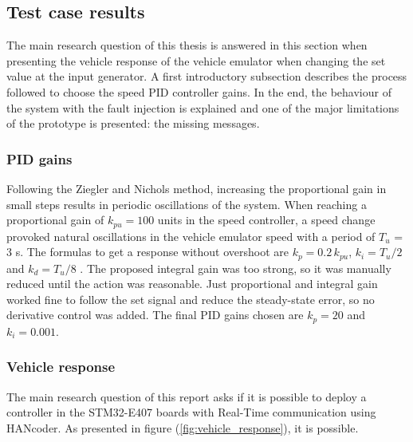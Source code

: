\documentclass[table,xcdraw]{article}
\begin{document}
\subsection{Test case results}
The main research question of this thesis is answered in this section when presenting the vehicle response of the vehicle emulator when changing the set value at the input generator. A first introductory subsection describes the process followed to choose the speed PID controller gains. In the end, the behaviour of the system with the fault injection is explained and one of the major limitations of the prototype is presented: the missing messages.

\subsubsection{PID gains}
Following the Ziegler and Nichols method, increasing the proportional gain in small steps results in periodic oscillations of the system. When reaching a proportional gain of $k_{pu} = 100$ units in the speed controller, a speed change provoked natural oscillations in the vehicle emulator speed with a period of $T_u$ = 3 s. The formulas to get a response without overshoot are $k_p = 0.2\,k_{pu}$, $k_i = T_u/2$ and $k_d = T_u/8$ \citep{ziegler_nichols_pid}. The proposed integral gain was too strong, so it was manually reduced until the action was reasonable. Just proportional and integral gain worked fine to follow the set signal and reduce the steady-state error, so no derivative control was added. The final PID gains chosen are $k_p = 20$ and $k_i = 0.001$.

\subsubsection{Vehicle response}
The main research question of this report asks if it is possible to deploy a controller in the STM32-E407 boards with Real-Time communication using HANcoder. As presented in figure (\ref{fig:vehicle_response}), it is possible.
\end{document}
